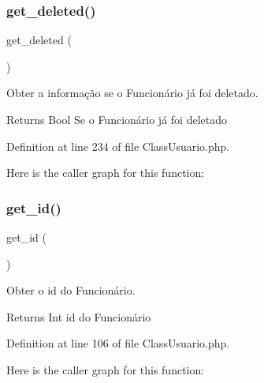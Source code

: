\mbox{\label{class_class_usuario_ad6172a0f313f12f05c08efc37a9c3656}} 
\subsubsection{\texorpdfstring{get\+\_\+deleted()}{get\_deleted()}}
{\footnotesize\ttfamily get\+\_\+deleted (\begin{DoxyParamCaption}{ }\end{DoxyParamCaption})}



Obter a informação se o Funcionário já foi deletado. 

\begin{DoxyReturn}{Returns}
Bool Se o Funcionário já foi deletado 
\end{DoxyReturn}


Definition at line 234 of file Class\+Usuario.\+php.

Here is the caller graph for this function\+:
\mbox{\label{class_class_usuario_a8a94003b9d888b085c68d6eac44be175}} 
\subsubsection{\texorpdfstring{get\+\_\+id()}{get\_id()}}
{\footnotesize\ttfamily get\+\_\+id (\begin{DoxyParamCaption}{ }\end{DoxyParamCaption})}



Obter o id do Funcionário. 

\begin{DoxyReturn}{Returns}
Int id do Funcionário 
\end{DoxyReturn}


Definition at line 106 of file Class\+Usuario.\+php.

Here is the caller graph for this function\+:
\mbox{\label{class_class_usuario_a09bc68f0d359d44f4f9a38f04fa69b0e}} 
